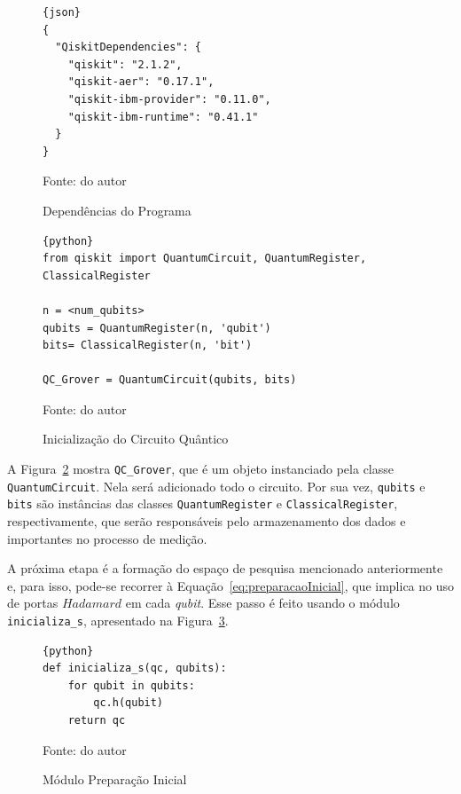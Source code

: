 \begin{figure}[!htb]
\centering
\caption{Dependências do Programa   } 
\begin{lstlisting}{json}
{
  "QiskitDependencies": {
    "qiskit": "2.1.2",
    "qiskit-aer": "0.17.1",
    "qiskit-ibm-provider": "0.11.0",
    "qiskit-ibm-runtime": "0.41.1"
  }
}
\end{lstlisting} 
{\small Fonte: do autor} 
\label{cod:dependencias} 
\end{figure}

\begin{figure}[!htb]
\centering
\caption{Inicialização do Circuito Qu\^{a}ntico} 
\begin{lstlisting}{python}
from qiskit import QuantumCircuit, QuantumRegister, ClassicalRegister

n = <num_qubits>
qubits = QuantumRegister(n, 'qubit')
bits= ClassicalRegister(n, 'bit')

QC_Grover = QuantumCircuit(qubits, bits)
\end{lstlisting} 
{\small Fonte: do autor} 
\label{cod:inicializacao} 
\end{figure}

A Figura~\ref{cod:inicializacao} mostra \verb|QC_Grover|, que é um objeto instanciado pela classe \verb|QuantumCircuit|. Nela será adicionado todo o circuito. Por sua vez, \verb|qubits| e \verb|bits| são instâncias das classes \verb|QuantumRegister| e \verb|ClassicalRegister|, respectivamente, que serão responsáveis pelo armazenamento dos dados e importantes no processo de medição.

A próxima etapa é a formação do espaço de pesquisa mencionado anteriormente e, para isso, pode-se recorrer à Equação~\ref{eq:preparacaoInicial}, que implica no uso de portas $Hadamard$ em cada \emph{qubit}. Esse passo é feito usando o módulo \verb|inicializa_s|, apresentado na Figura~\ref{cod:preparacao}.

\begin{figure}[!htb]
\centering
\caption{Módulo Preparação Inicial} 
\begin{lstlisting}{python}
def inicializa_s(qc, qubits):
    for qubit in qubits:
        qc.h(qubit)
    return qc
\end{lstlisting} 
{\small Fonte: do autor} 
\label{cod:preparacao} 
\end{figure}

